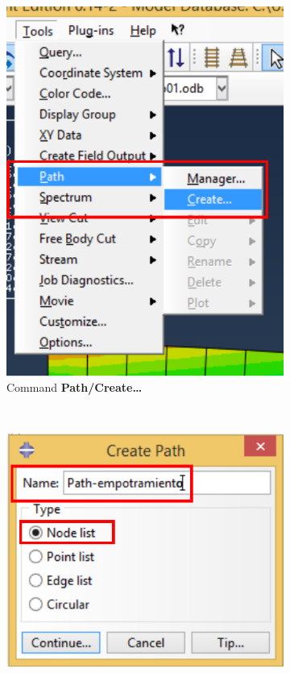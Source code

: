 \begin{enumerate}
\begin{figure}[H]
\begin{subfigure}{0.30\textwidth}
     \includegraphics[width=\textwidth]{./body/images/imagen99.pdf}
     \caption{Command \textbf{Path/Create\ldots}}
     \label{figu99}
   \end{subfigure}%
   ~ %
   \begin{subfigure}{0.39\textwidth}
     \includegraphics[width=\textwidth]{./body/images/imagen100.pdf}

\end{subfigure}
\end{figure}
\end{enumerate}
